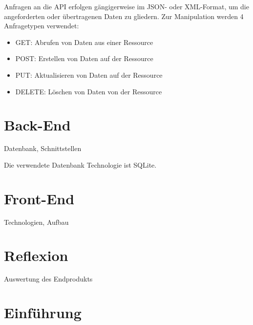 Anfragen an die API erfolgen gängigerweise im JSON- oder XML-Format, um die angeforderten oder übertragenen Daten zu gliedern. Zur Manipulation werden 4 Anfragetypen verwendet:
\begin{itemize}
	\item GET: Abrufen von Daten aus einer Ressource
	\item POST: Erstellen von Daten auf der Ressource
	\item PUT: Aktualisieren von Daten auf der Ressource
	\item DELETE: Löschen von Daten von der Ressource
\end{itemize}

\chapter{Back-End}
Datenbank, Schnittstellen

Die verwendete Datenbank Technologie ist SQLite.
\chapter{Front-End}
Technologien, Aufbau

\chapter{Reflexion}
Auswertung des Endprodukts

\chapter{Einführung}




